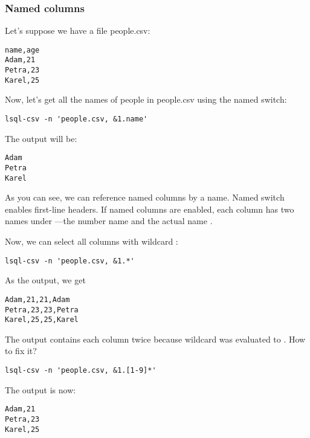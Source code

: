 \subsubsection{Named columns}
Let's suppose we have a file people.csv:
\begin{verbatim}
name,age                                                                                                                                                                                                                                   
Adam,21                                                                                                                                                                                                                                    
Petra,23                                                                                                                                                                                                                                   
Karel,25
\end{verbatim}

Now, let's get all the names of people in people.csv using the  named switch:
\begin{verbatim}
lsql-csv -n 'people.csv, &1.name'
\end{verbatim}
The output will be:
\begin{verbatim}
Adam
Petra
Karel
\end{verbatim}

As you can see, we can reference named columns by a name. Named switch  enables first-line headers.
If named columns are enabled, each column has two names under ---the number name  and the actual name .

Now, we can select all columns with wildcard :
\begin{verbatim}
lsql-csv -n 'people.csv, &1.*'
\end{verbatim}
As the output, we get
\begin{verbatim}
Adam,21,21,Adam
Petra,23,23,Petra
Karel,25,25,Karel
\end{verbatim}

The output contains each column twice because wildcard  was evaluated to .
How to fix it?
\begin{verbatim}
lsql-csv -n 'people.csv, &1.[1-9]*'
\end{verbatim}
The output is now:
\begin{verbatim}
Adam,21
Petra,23
Karel,25
\end{verbatim}

